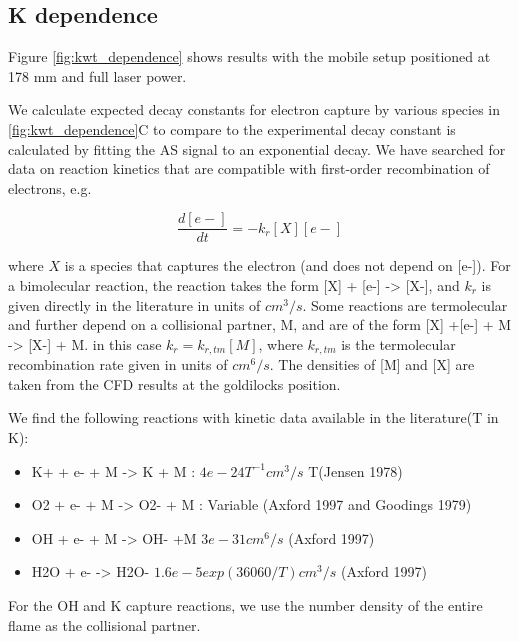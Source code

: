 \clearpage

\subsection{K dependence}

Figure \ref{fig:kwt_dependence} shows results with the mobile setup positioned at 178 mm and full laser power. 

We calculate expected decay constants for electron capture by various species in \ref{fig:kwt_dependence}C to compare to the experimental decay constant is calculated by fitting the AS signal to an exponential decay. We have searched for data on reaction kinetics that are compatible with first-order recombination of electrons, e.g.

\begin{equation}
    \frac{d[e-]}{dt} = - k_r [X][e-]
\end{equation}

where $X$ is a species that captures the electron (and does not depend on [e-]). For a bimolecular reaction, the reaction takes the form [X] + [e-] -> [X-], and $k_r$ is given directly in the literature in units of $cm^3/s$. Some reactions are termolecular and further depend on a collisional partner, M, and are of the form [X] +[e-] + M -> [X-] + M. in this case $k_r = k_{r,tm} [M]$, where $k_{r,tm}$ is the termolecular recombination rate given in units of $cm^6/s$.  The densities of [M] and [X] are taken from the CFD results at the goldilocks position.

We find the following reactions with kinetic data available in the literature(T in K):

\begin{itemize}
    \item K+ + e- + M -> K + M : $4e-24 T^{-1} cm^3/s$ T(Jensen 1978) 
    \item O2 + e- + M -> O2- + M : Variable (Axford 1997 and Goodings 1979)
    \item OH + e- + M -> OH- +M  $3e-31 cm^6/s$ (Axford 1997)
    \item H2O + e- -> H2O- $1.6e-5 exp(36060/T) cm^3/s$ (Axford 1997)
\end{itemize}

For the OH and K capture reactions, we use the number density of the entire flame as the collisional partner. 

